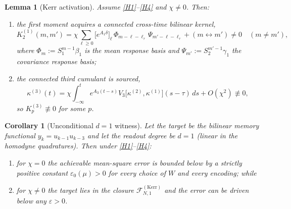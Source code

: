 \documentclass[10pt,a4paper]{amsart}
\newtheorem{lemma}{Lemma}
\newtheorem{corollary}{Corollary}
\newcommand{\Fclass}[2]{\mathcal{F}^{(#1)}_{#2}}
\newcommand{\Kerr}{\mathrm{Kerr}}
\begin{document}
\begin{lemma}[Kerr activation]\label{lem:kerr}
Assume \ref{H1}--\ref{H4} and $\chi\neq0$. Then:
\begin{enumerate}[label=(\alph*)]
\item the first moment acquires a connected cross-time bilinear kernel,
\[
K^{(1)}_2(m,m') = \chi\sum_{\ell\ge0}\big[e^{A_1\delta}\big]_\ell\,
\Phi_{m-\ell-\ell_\tau}\,\Psi_{m'-\ell-\ell_\tau} + (m\leftrightarrow m')\neq0
\quad (m\neq m'),
\]
where $\Phi_m:=S_1^{m-1}\beta_1$ is the mean response basis and
$\Psi_{m'}:=S_2^{m'-1}\gamma_1$ the covariance response basis;
\item the connected third cumulant is sourced,
\[
\kappa^{(3)}(t) = \chi\int_{-\infty}^t e^{A_3(t-s)}
V_3\!\big[\kappa^{(2)},\kappa^{(1)}\big](s-\tau)\,ds + O(\chi^2)\not\equiv0,
\]
so $K^{(3)}_p\not\equiv0$ for some $p$.
\end{enumerate}
\end{lemma}

\begin{corollary}[Unconditional $d=1$ witness]\label{cor:witness}
Let the target be the bilinear memory functional $y_k=u_{k-1}u_{k-3}$ and let the
readout degree be $d=1$ (linear in the homodyne quadratures). Then under
\ref{H1}--\ref{H4}:
\begin{enumerate}[label=(\roman*)]
\item for $\chi=0$ the achievable mean-square error is bounded below by a
strictly positive constant $\varepsilon_0(\mu)>0$ for every choice of $W$ and
every encoding; while
\item for $\chi\neq0$ the target lies in the closure $\Fclass{\Kerr}{N,1}$ and the
error can be driven below any $\varepsilon>0$.
\end{enumerate}
\end{corollary}
\end{document}

